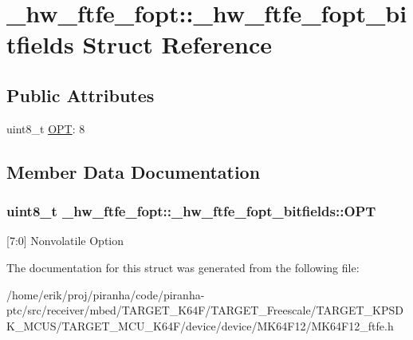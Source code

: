 \hypertarget{struct__hw__ftfe__fopt_1_1__hw__ftfe__fopt__bitfields}{}\section{\+\_\+hw\+\_\+ftfe\+\_\+fopt\+:\+:\+\_\+hw\+\_\+ftfe\+\_\+fopt\+\_\+bitfields Struct Reference}
\label{struct__hw__ftfe__fopt_1_1__hw__ftfe__fopt__bitfields}
\subsection*{Public Attributes}
\begin{DoxyCompactItemize}
\item 
uint8\+\_\+t \hyperlink{struct__hw__ftfe__fopt_1_1__hw__ftfe__fopt__bitfields_af0bdc2f1ada6011e72bee7d159c5a587}{O\+PT}\+: 8
\end{DoxyCompactItemize}


\subsection{Member Data Documentation}
\subsubsection[{\texorpdfstring{O\+PT}{OPT}}]{\setlength{\rightskip}{0pt plus 5cm}uint8\+\_\+t \+\_\+hw\+\_\+ftfe\+\_\+fopt\+::\+\_\+hw\+\_\+ftfe\+\_\+fopt\+\_\+bitfields\+::\+O\+PT}\hypertarget{struct__hw__ftfe__fopt_1_1__hw__ftfe__fopt__bitfields_af0bdc2f1ada6011e72bee7d159c5a587}{}\label{struct__hw__ftfe__fopt_1_1__hw__ftfe__fopt__bitfields_af0bdc2f1ada6011e72bee7d159c5a587}
\mbox{[}7\+:0\mbox{]} Nonvolatile Option 

The documentation for this struct was generated from the following file\+:\begin{DoxyCompactItemize}
\item 
/home/erik/proj/piranha/code/piranha-\/ptc/src/receiver/mbed/\+T\+A\+R\+G\+E\+T\+\_\+\+K64\+F/\+T\+A\+R\+G\+E\+T\+\_\+\+Freescale/\+T\+A\+R\+G\+E\+T\+\_\+\+K\+P\+S\+D\+K\+\_\+\+M\+C\+U\+S/\+T\+A\+R\+G\+E\+T\+\_\+\+M\+C\+U\+\_\+\+K64\+F/device/device/\+M\+K64\+F12/M\+K64\+F12\+\_\+ftfe.\+h\end{DoxyCompactItemize}
